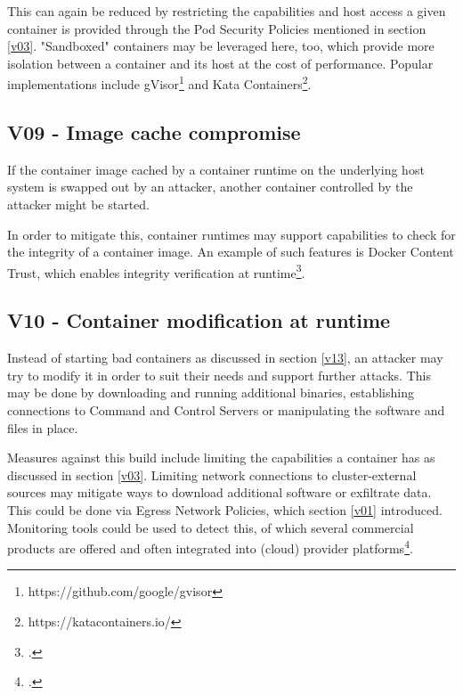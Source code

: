 This can again be reduced by restricting the capabilities and host access a given container is provided through the Pod Security Policies mentioned in section \ref{v03}.
"Sandboxed" containers may be leveraged here, too, which provide more isolation between a container and its host at the cost of performance. Popular implementations include gVisor\footnote{https://github.com/google/gvisor} and Kata Containers\footnote{https://katacontainers.io/}.

\subsection{V09 - Image cache compromise}
If the container image cached by a container runtime on the underlying host system is swapped out by an attacker, another container controlled by the attacker might be started.

In order to mitigate this, container runtimes may support capabilities to check for the integrity of a container image. An example of such features is Docker Content Trust, which enables integrity verification at runtime\footcite[][, section 'About Docker Content Trust (DCT)']{dockerContentTrust}.

\subsection{V10 - Container modification at runtime} \label{v10}
Instead of starting bad containers as discussed in section \ref{v13}, an attacker may try to modify it in order to suit their needs and support further attacks.
This may be done by downloading and running additional binaries, establishing connections to Command and Control Servers or manipulating the software and files in place.

Measures against this build include limiting the capabilities a container has as discussed in section \ref{v03}. Limiting network connections to cluster-external sources may mitigate ways to download additional software or exfiltrate data. This could be done via Egress Network Policies, which section \ref{v01} introduced.
Monitoring tools could be used to detect this, of which several commercial products are offered and often integrated into (cloud) provider platforms\footcite[][, slide 40 to 41]{runtimeProt}.

